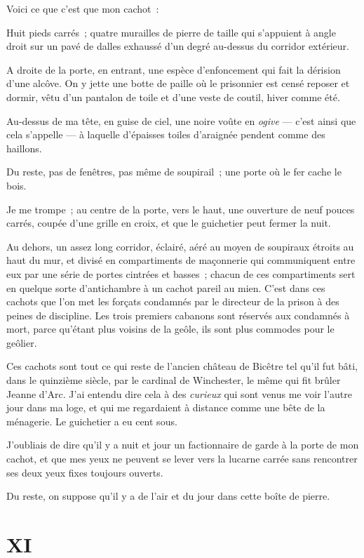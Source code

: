 \documentclass[french,twoside]{book} %
\begin{document}
\noindent Voici ce que c’est que mon cachot :\par
Huit pieds carrés ; quatre murailles de pierre de taille qui s’appuient à angle droit sur un pavé de dalles exhaussé d’un degré au-dessus du corridor extérieur.\par
A droite de la porte, en entrant, une espèce d’enfoncement qui fait la dérision d’une alcôve. On y jette une botte de paille où le prisonnier est censé reposer et dormir, vêtu d’un pantalon de toile et d’une veste de coutil, hiver comme été.\par
Au-dessus de ma tête, en guise de ciel, une noire voûte en \emph{ogive} — c’est ainsi que cela s’appelle — à laquelle d’épaisses toiles d’araignée pendent comme des haillons.\par
Du reste, pas de fenêtres, pas même de soupirail ; une porte où le fer cache le bois.\par
Je me trompe ; au centre de la porte, vers le haut, une ouverture de neuf pouces carrés, coupée  d’une grille en croix, et que le guichetier peut fermer la nuit.\par
Au dehors, un assez long corridor, éclairé, aéré au moyen de soupiraux étroits au haut du mur, et divisé en compartiments de maçonnerie qui communiquent entre eux par une série de portes cintrées et basses ; chacun de ces compartiments sert en quelque sorte d’antichambre à un cachot pareil au mien. C’est dans ces cachots que l’on met les forçats condamnés par le directeur de la prison à des peines de discipline. Les trois premiers cabanons sont réservés aux condamnés à mort, parce qu’étant plus voisins de la geôle, ils sont plus commodes pour le geôlier.\par
Ces cachots sont tout ce qui reste de l’ancien château de Bicêtre tel qu’il fut bâti, dans le quinzième siècle, par le cardinal de Winchester, le même qui fit brûler Jeanne d’Arc. J’ai entendu dire cela à des \emph{curieux} qui sont venus me voir l’autre jour dans ma loge, et qui me regardaient à distance comme une bête de la ménagerie. Le guichetier a eu cent sous.\par
J’oubliais de dire qu’il y a nuit et jour un factionnaire de garde à la porte de mon cachot, et que mes yeux ne peuvent se lever vers la lucarne carrée sans rencontrer ses deux yeux fixes toujours ouverts.\par
Du reste, on suppose qu’il y a de l’air et du jour dans cette boîte de pierre.
 \section[{XI}]{XI}
\label{ch11}\renewcommand{\leftmark}{XI}
\end{document}
